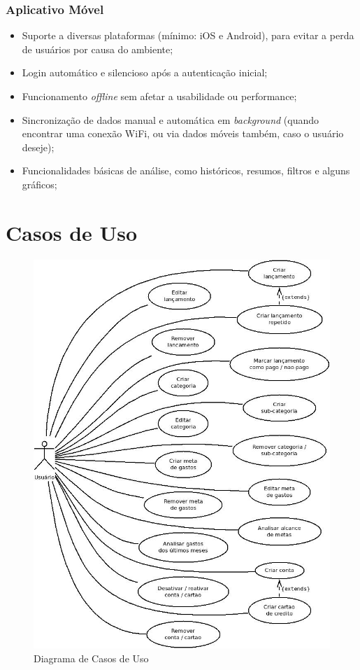 \documentclass[a4paper]{abnt}
\begin{document}
\subsubsection{Aplicativo Móvel}
\begin{itemize}
	\item Suporte a diversas plataformas (mínimo: iOS e Android), para evitar a perda de usuários por causa do ambiente;
	\item Login automático e silencioso após a autenticaç\~ao inicial;
	\item Funcionamento \emph{offline} sem afetar a usabilidade ou performance;
	\item Sincronizaç\~ao de dados manual e automática em \emph{background} (quando encontrar uma conex\~ao WiFi, ou via dados móveis também, caso o usuário deseje);
	\item Funcionalidades básicas de análise, como históricos, resumos, filtros e alguns gráficos;
\end{itemize}
		

\pagebreak
\section{Casos de Uso}

\begin{figure}[!h]
	\centering
	\includegraphics[scale=0.6]{diagramas/casos-de-uso.jpg}
	\caption{Diagrama de Casos de Uso}
\end{figure}
\end{document}
